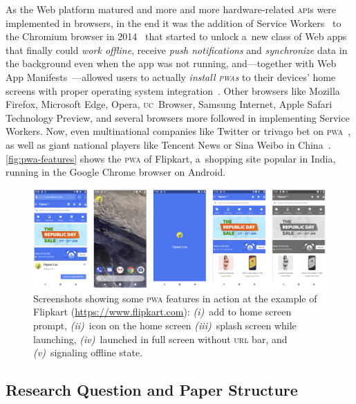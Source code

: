 \documentclass[sigconf]{acmart}
\begin{document}
As the Web platform matured and more and more
hardware-related \textsc{api}s were implemented in browsers,
in the end it was the addition of Service Workers~\cite{russell2017serviceworkers}
to the Chromium browser in 2014~\cite{cooney2014chromium} that started to unlock a~new class of Web apps
that finally could \emph{work offline}, receive \emph{push notifications}
and \emph{synchronize} data in the background even when the app was not running,
and---together with Web App Manifests~\cite{caceres2017manifest}---allowed
users to actually \emph{install \textsc{pwa}s} to their devices' home screens
with proper operating system integration~\cite{kinlan2017a2hs}.
Other browsers like Mozilla Firefox, Microsoft Edge, Opera, \textsc{uc}~Browser, Samsung Internet,
Apple Safari Technology Preview, and several browsers more followed in implementing Service Workers.
Now, even multinational companies like Twitter
or trivago bet on \textsc{pwa}~\cite{gallagher2017twitterlite,twg2017trivago},
as well as giant national players like Tencent News or Sina Weibo in China~\cite{zhu2017pwa}.
\autoref{fig:pwa-features} shows the \textsc{pwa} of Flipkart, a~shopping site popular in India,
running in the Google Chrome browser on Android.

\begin{figure}[hbt]
  \centering
  \includegraphics[width=\columnwidth]{pwa-features}
  \caption[Screenshots showing some \textsc{pwa} features]{
    Screenshots showing some \textsc{pwa} features in action
    at the example of Flipkart (\url{https://www.flipkart.com}):
    \emph{(i)}~add to home screen prompt, \emph{(ii)}~icon on the home screen
    \emph{(iii)}~splash screen while launching,
    \emph{(iv)}~launched in full screen without \textsc{url} bar, and
    \emph{(v)}~signaling offline state.}
  \label{fig:pwa-features}
\end{figure}

\subsection{Research Question and Paper Structure}
\end{document}
